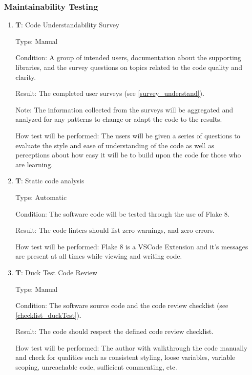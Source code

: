 \documentclass[12pt, titlepage]{article}
\newcounter{testnum} %
\begin{document}
\subsubsection{Maintainability Testing}

\begin{enumerate}

  \item{\textbf{T\thetestnum \label{T_understandSurvey}}: Code Understandability Survey\\}
            
  Type: Manual
            
  Condition: A group of intended users, 
  documentation about the supporting libraries, and the survey questions on topics related 
  to the code quality and clarity.
            
  Result: The completed user surveys (see \ref{survey_understand}).
            
  Note: The information collected from the surveys
  will be aggregated and analyzed for any patterns to
  change or adapt the code to the results.
            
  How test will be performed: The users will be given a series of questions to evaluate 
  the style and ease of understanding of the code as well as perceptions about how easy it will 
  be to build upon the code for those who are learning.

  \item{\textbf{T\thetestnum \label{T_linters}}: Static code analysis\\}

  Type: Automatic
            
  Condition: The software code will be tested through the use of Flake 8.
            
  Result: The code linters should list zero warnings, and zero errors.
            
  How test will be performed: Flake 8 is a VSCode Extension and it's messages are present at all times while 
  viewing and writing code.

  \item{\textbf{T\thetestnum \label{T_duckTest}}: Duck Test Code Review\\}

  Type: Manual
            
  Condition: The software source code and the code review checklist (see \ref{checklist_duckTest}).
            
  Result: The code should respect the defined code review checklist.
            
  How test will be performed: The author with walkthrough the code manually and check for qualities
    such as consistent styling, loose variables, variable scoping, unreachable code, 
    sufficient commenting, etc.
\end{enumerate}
\end{document}
